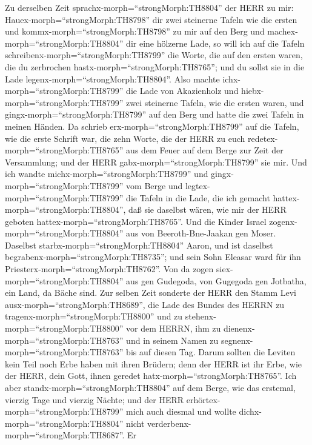  Zu derselben Zeit sprachx-morph=``strongMorph:TH8804'' der
HERR zu mir: Hauex-morph=``strongMorph:TH8798'' dir zwei steinerne
Tafeln wie die ersten und kommx-morph=``strongMorph:TH8798'' zu mir auf
den Berg und machex-morph=``strongMorph:TH8804'' dir eine hölzerne Lade,
 so will ich auf die Tafeln
schreibenx-morph=``strongMorph:TH8799'' die Worte, die auf den ersten
waren, die du zerbrochen hastx-morph=``strongMorph:TH8765''; und du
sollst sie in die Lade legenx-morph=``strongMorph:TH8804''. 
Also machte ichx-morph=``strongMorph:TH8799'' die Lade von Akazienholz
und hiebx-morph=``strongMorph:TH8799'' zwei steinerne Tafeln, wie die
ersten waren, und gingx-morph=``strongMorph:TH8799'' auf den Berg und
hatte die zwei Tafeln in meinen Händen.  Da schrieb
erx-morph=``strongMorph:TH8799'' auf die Tafeln, wie die erste Schrift
war, die zehn Worte, die der HERR zu euch
redetex-morph=``strongMorph:TH8765'' aus dem Feuer auf dem Berge zur
Zeit der Versammlung; und der HERR gabx-morph=``strongMorph:TH8799'' sie
mir.  Und ich wandte michx-morph=``strongMorph:TH8799'' und
gingx-morph=``strongMorph:TH8799'' vom Berge und
legtex-morph=``strongMorph:TH8799'' die Tafeln in die Lade, die ich
gemacht hattex-morph=``strongMorph:TH8804'', daß sie daselbst wären, wie
mir der HERR geboten hattex-morph=``strongMorph:TH8765''. 
Und die Kinder Israel zogenx-morph=``strongMorph:TH8804'' aus von
Beeroth-Bne-Jaakan gen Moser. Daselbst
starbx-morph=``strongMorph:TH8804'' Aaron, und ist daselbst
begrabenx-morph=``strongMorph:TH8735''; und sein Sohn Eleasar ward für
ihn Priesterx-morph=``strongMorph:TH8762''.  Von da zogen
siex-morph=``strongMorph:TH8804'' aus gen Gudegoda, von Gugegoda gen
Jotbatha, ein Land, da Bäche sind.  Zur selben Zeit sonderte
der HERR den Stamm Levi ausx-morph=``strongMorph:TH8689'', die Lade des
Bundes des HERRN zu tragenx-morph=``strongMorph:TH8800'' und zu
stehenx-morph=``strongMorph:TH8800'' vor dem HERRN, ihm zu
dienenx-morph=``strongMorph:TH8763'' und in seinem Namen zu
segnenx-morph=``strongMorph:TH8763'' bis auf diesen Tag. 
Darum sollten die Leviten kein Teil noch Erbe haben mit ihren Brüdern;
denn der HERR ist ihr Erbe, wie der HERR, dein Gott, ihnen geredet
hatx-morph=``strongMorph:TH8765''.  Ich aber
standx-morph=``strongMorph:TH8804'' auf dem Berge, wie das erstemal,
vierzig Tage und vierzig Nächte; und der HERR
erhörtex-morph=``strongMorph:TH8799'' mich auch diesmal und wollte
dichx-morph=``strongMorph:TH8804'' nicht
verderbenx-morph=``strongMorph:TH8687''.  Er

